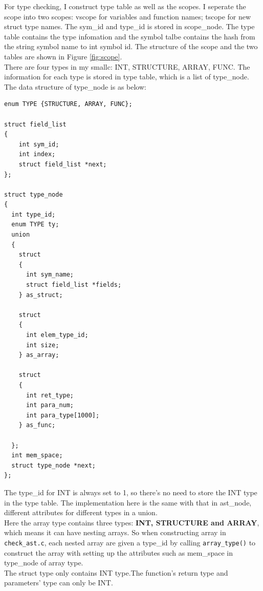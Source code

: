 \documentclass[a4paper]{article}
\begin{document}
For type checking, I construct type table as well as the scopes. I seperate the scope into two scopes: vscope for variables and function names; tscope for new struct type names. The sym\_id and type\_id is stored in scope\_node. The type table contains the type infomation and the symbol talbe contains the hash from the string symbol name to int symbol id. The structure of the scope and the two tables are shown in Figure \ref{fig:scope}.\\

There are four types in my smallc: INT, STRUCTURE, ARRAY, FUNC. The information for each type is stored in type table, which is a list of type\_node. The data structure of type\_node is as below:

\begin{verbatim}
enum TYPE {STRUCTURE, ARRAY, FUNC};

struct field_list
{
	int sym_id;
	int index;
	struct field_list *next;
};

struct type_node
{
  int type_id;
  enum TYPE ty;
  union
  {
    struct
    {
      int sym_name;
      struct field_list *fields;
    } as_struct;
    
    struct 
    {
      int elem_type_id;
      int size;
    } as_array;
    
    struct
    {
      int ret_type;
      int para_num; 
      int para_type[1000];
    } as_func;
    
  };
  int mem_space;
  struct type_node *next;
};

\end{verbatim}
The type\_id for INT is always set to 1, so there's no need to store the INT type in the type table. The implementation here is the same with that in ast\_node, different attributes for different types in a union.\\


Here the array type contains three types: \textbf{INT, STRUCTURE and ARRAY}, which means it can have nesting arrays. So when constructing array in \texttt{check\_ast.c}, each nested array are given a type\_id by calling \texttt{array\_type()} to construct the array with setting up the attributes such as mem\_space in type\_node of array type.\\
The struct type only contains INT type.The function's return type and parameters' type can only be INT.
 
\end{document}
